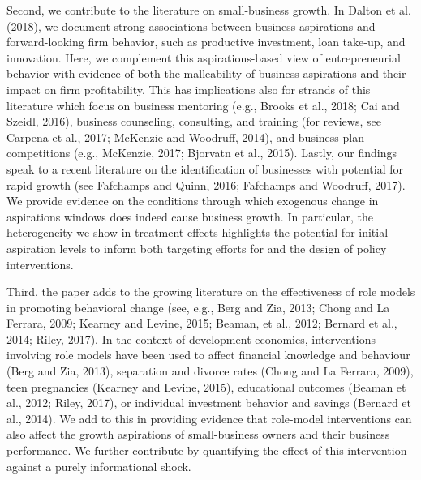 \documentclass[11.5pt]{article}
\begin{document}
Second, we contribute to the literature on small-business growth. In Dalton et al. (2018), we document strong associations between business aspirations and forward-looking firm behavior, such as productive investment, loan take-up, and innovation. Here, we complement this aspirations-based view of entrepreneurial behavior with evidence of both the malleability of business aspirations and their impact on firm profitability. This has implications also for strands of this literature which focus on business mentoring (e.g., Brooks et al., 2018; Cai and Szeidl, 2016), business counseling, consulting, and training (for reviews, see Carpena et al., 2017; McKenzie and Woodruff, 2014), and business plan competitions (e.g., McKenzie, 2017; Bjorvatn et al., 2015). Lastly, our findings speak to a recent literature on the identification of businesses with potential for rapid growth (see Fafchamps and Quinn, 2016; Fafchamps and Woodruff, 2017). We provide evidence on the conditions through which exogenous change in aspirations windows does indeed cause business growth. In particular, the heterogeneity we show in treatment effects highlights the potential for initial aspiration levels to inform both targeting efforts for and the design of policy interventions.

Third, the paper adds to the growing literature on the effectiveness of role models in promoting behavioral change (see, e.g., Berg and Zia, 2013; Chong and La Ferrara, 2009; Kearney and Levine, 2015; Beaman, et al., 2012; Bernard et al., 2014; Riley, 2017). %
In the context of development economics, interventions involving role models have been used to affect financial knowledge and behaviour (Berg and Zia, 2013), separation and divorce rates (Chong and La Ferrara, 2009), teen pregnancies (Kearney and Levine, 2015), educational outcomes (Beaman et al., 2012; Riley, 2017), or individual investment behavior and savings (Bernard et al., 2014). We add to this in providing evidence that role-model interventions can also affect the growth aspirations of small-business owners and their business performance. We further contribute by quantifying the effect of this intervention against a purely informational shock.
\end{document}

